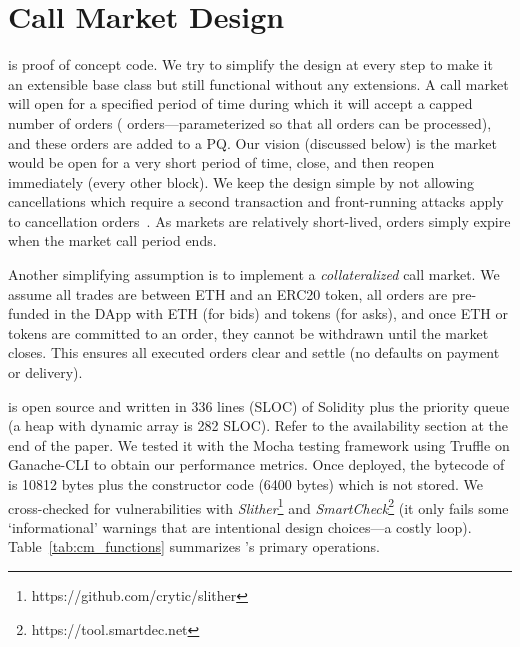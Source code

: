 
\section{Call Market Design}



\cm is proof of concept code. We try to simplify the design at every step to make it an extensible base class but still functional without any extensions. A call market will open for a specified period of time during which it will accept a capped number of orders ( orders---parameterized so that all orders can be processed), and these orders are added to a PQ. Our vision (discussed below) is the market would be open for a very short period of time, close, and then reopen immediately (\eg every other block). We keep the design simple by not allowing cancellations which require a second transaction and front-running attacks apply to cancellation orders~\cite{eskandari2019sok}. As markets are relatively short-lived, orders simply expire when the market call period ends.

Another simplifying assumption is to implement a \textit{collateralized} call market. We assume all trades are between ETH and an ERC20 token, all orders are pre-funded in the DApp with ETH (for bids) and tokens (for asks), and once ETH or tokens are committed to an order, they cannot be withdrawn until the market closes. This ensures all executed orders clear and settle (\ie no defaults on payment or delivery).


\cm is open source and written in 336 lines (SLOC) of Solidity plus the priority queue (\eg a heap with dynamic array is 282 SLOC). Refer to the availability section at the end of the paper. We tested it with the Mocha testing framework using Truffle on Ganache-CLI to obtain our performance metrics. Once deployed, the bytecode of \cm is 10812 bytes plus the constructor code (6400 bytes) which is not stored. We cross-checked for vulnerabilities with \textit{Slither}\footnote{https://github.com/crytic/slither} and \textit{SmartCheck}\footnote{https://tool.smartdec.net} (it only fails some `informational' warnings that are intentional design choices---\eg a costly loop). Table~\ref{tab:cm_functions} summarizes \cm's primary operations.

